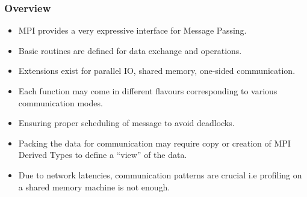 \begin{frame}
  \frametitle{Overview}
  
\begin{itemize}
\item MPI provides a very expressive interface for Message Passing.
\item Basic routines are defined for data exchange and operations.
\item Extensions exist for parallel IO, shared memory, one-sided communication.
\item Each function may come in different flavours corresponding to various communication modes.
\item Ensuring proper scheduling of message to avoid deadlocks.
\item Packing the data for communication may require copy or creation of MPI Derived Types to define a ``view'' of the data.
\item Due to network latencies, communication patterns are crucial i.e profiling on a shared memory machine is not enough.
\end{itemize}

\end{frame}


